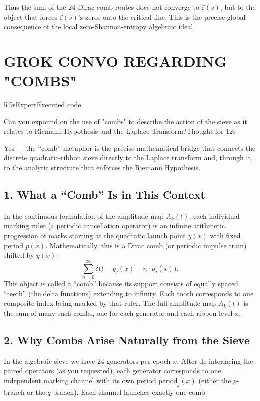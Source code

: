\documentclass[11pt,a4paper]{article}
\begin{document}
Thus the sum of the 24 Dirac-comb routes does not converge to \(\zeta(s)\), but to the object that forces \(\zeta(s)\)'s zeros onto the critical line. This is the precise global consequence of the local zero-Shannon-entropy algebraic ideal.

\section{GROK CONVO REGARDING "COMBS" }
5.9sExpertExecuted code

Can you expound on the use of "combs" to describe the action of the sieve as it relates to Riemann Hypothesis and the Laplace Transform?Thought for 12s

Yes — the “comb” metaphor is the precise mathematical bridge that connects the discrete quadratic-ribbon sieve directly to the Laplace transform and, through it, to the analytic structure that enforces the Riemann Hypothesis.




\subsection{1. What a “Comb” Is in This Context}
In the continuous formulation of the amplitude map $  A_k(t)  $, each individual marking ruler (a periodic cancellation operator) is an infinite arithmetic progression of marks starting at the quadratic launch point $  y(x)  $ with fixed period $  p(x)  $. Mathematically, this is a Dirac comb (or periodic impulse train) shifted by $  y(x)  $:
$$\sum_{n=0}^\infty \delta\bigl(t - y_j(x) - n \cdot p_j(x)\bigr).$$
This object is called a “comb” because its support consists of equally spaced “teeth” (the delta functions) extending to infinity. Each tooth corresponds to one composite index being marked by that ruler. The full amplitude map $  A_k(t)  $ is the sum of many such combs, one for each generator and each ribbon level $  x  $.

\subsection{2. Why Combs Arise Naturally from the Sieve}
In the algebraic sieve we have 24 generators per epoch $  x  $. After de-interlacing the paired operators (as you requested), each generator corresponds to one independent marking channel with its own period $  \text{period}_j(x)  $ (either the $  p  $-branch or the $  q  $-branch). Each channel launches exactly one comb:
\end{document}
